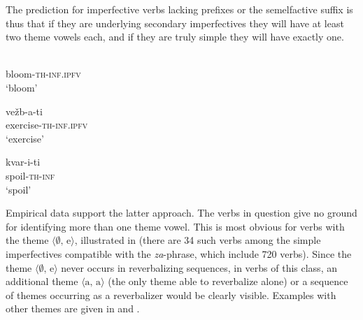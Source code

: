 \documentclass[output=paper]{langscibook}
\begin{document}
\noindent The prediction for imperfective verbs lacking prefixes or the semelfactive suffix is thus that if they are underlying secondary imperfectives they will have at least two theme vowels each, and if they are truly simple they will have exactly one.

\ea\label{ars:ex:simples}
	\begin{xlist} 
		
	    \ex  {}\\ 
                  bloom-\textsc{th-inf.ipfv} \\ 
            \glt `bloom' \label{ars:ex:simplesa}
            
        \ex  \gll vežb-a-ti\\ 
                  exercise-\textsc{th-inf.ipfv}\\ 
            \glt `exercise' \label{ars:ex:simplesb}
            
        \ex  \gll kvar-i-ti\\ 
                  spoil-\textsc{th-inf}\\ 
            \glt `spoil' \label{ars:ex:simplesc}

	\end{xlist}
\z

\noindent Empirical data support the latter approach. The verbs in question give no ground for identifying more than one theme vowel. This is most obvious for verbs with the theme $\langle \emptyset\text{, e}\rangle$, illustrated in  (there are 34 such verbs among the simple imperfectives compatible with the \textit{za}-phrase, which include 720 verbs). Since the theme $\langle \emptyset\text{, e}\rangle$ never occurs in reverbalizing sequences, in verbs of this class, an additional theme $\langle\text{a, a}\rangle$ (the only theme able to reverbalize alone) or a sequence of themes occurring as a reverbalizer would be clearly visible. Examples with other themes are given in  and .
\end{document}
